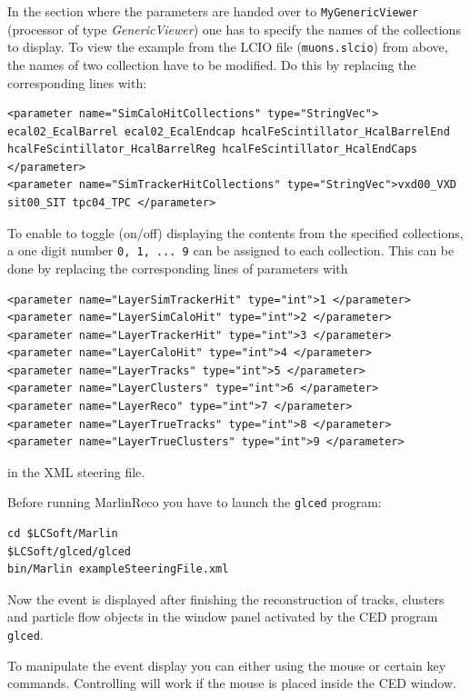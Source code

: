 In the section 
where the parameters are handed over to {\tt MyGenericViewer} 
(processor of type {\em GenericViewer}) one has to specify the 
names of the collections to display. To view the example from the LCIO file 
({\tt muons.slcio}) from above, the names of two collection have to be
modified. Do this by replacing the corresponding lines with:

\begin{verbatim}
<parameter name="SimCaloHitCollections" type="StringVec"> ecal02_EcalBarrel ecal02_EcalEndcap hcalFeScintillator_HcalBarrelEnd hcalFeScintillator_HcalBarrelReg hcalFeScintillator_HcalEndCaps </parameter>
<parameter name="SimTrackerHitCollections" type="StringVec">vxd00_VXD sit00_SIT tpc04_TPC </parameter>
\end{verbatim}

To enable to toggle (on/off) displaying the contents from the 
specified collections, a one digit number {\tt 0, 1, ... 9} can be assigned 
to each collection. This can be done by replacing the corresponding 
lines of parameters with 

\begin{verbatim}
<parameter name="LayerSimTrackerHit" type="int">1 </parameter>
<parameter name="LayerSimCaloHit" type="int">2 </parameter>
<parameter name="LayerTrackerHit" type="int">3 </parameter>
<parameter name="LayerCaloHit" type="int">4 </parameter>
<parameter name="LayerTracks" type="int">5 </parameter>
<parameter name="LayerClusters" type="int">6 </parameter>
<parameter name="LayerReco" type="int">7 </parameter>
<parameter name="LayerTrueTracks" type="int">8 </parameter>
<parameter name="LayerTrueClusters" type="int">9 </parameter>
\end{verbatim}

in the XML steering file.

Before running MarlinReco you have to launch the {\tt glced} program:

\begin{verbatim}
cd $LCSoft/Marlin
$LCSoft/glced/glced
bin/Marlin exampleSteeringFile.xml
\end{verbatim}

Now the event is displayed after finishing the reconstruction of 
tracks, clusters and particle flow objects in the window panel activated by 
the CED program {\tt glced}.

To manipulate the event display you can either using the mouse or 
certain key commands. Controlling will work if the mouse is placed
inside the CED window. 

